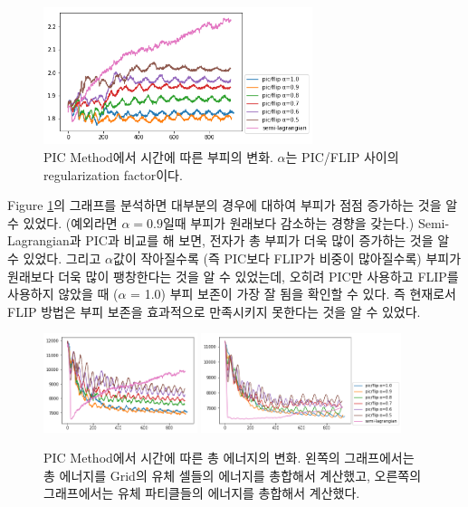 \documentclass[11pt, A4]{article}
\begin{document}
\begin{figure}[h]
  \centering
  \includegraphics[width=0.7\textwidth]{picflip-volume-graph}
  \caption{PIC Method에서 시간에 따른 부피의 변화. $\alpha$는 PIC/FLIP 사이의 regularization factor이다. }
  \label{volume-increase-graph}
\end{figure}

Figure \ref{volume-increase-graph}의 그래프를 분석하면 대부분의 경우에 대하여 부피가 점점 증가하는 것을 알 수 있었다. (예외라면 $\alpha=0.9$일때 부피가 원래보다 감소하는 경향을 갖는다.) Semi-Lagrangian과 PIC과 비교를 해 보면, 전자가 총 부피가 더욱 많이 증가하는 것을 알 수 있었다. 그리고 $\alpha$값이 작아질수록 (즉 PIC보다 FLIP가 비중이 많아질수록) 부피가 원래보다 더욱 많이 팽창한다는 것을 알 수 있었는데, 오히려 PIC만 사용하고 FLIP를 사용하지 않았을 때 ($\alpha$ = 1.0) 부피 보존이 가장 잘 됨을 확인할 수 있다. 즉 현재로서 FLIP 방법은 부피 보존을 효과적으로 만족시키지 못한다는 것을 알 수 있었다. 

\begin{figure}[h]
  \centering
  \includegraphics[width=0.4\textwidth]{picflip-energy-graph}
  \includegraphics[width=0.52\textwidth]{picflip-particle-energy-graph}
  \caption{PIC Method에서 시간에 따른 총 에너지의 변화. 왼쪽의 그래프에서는 총 에너지를 Grid의 유체 셀들의 에너지를 총합해서 계산했고, 오른쪽의 그래프에서는 유체 파티클들의 에너지를 총합해서 계산했다.}
  \label{energy-graph}
\end{figure}
\end{document}
